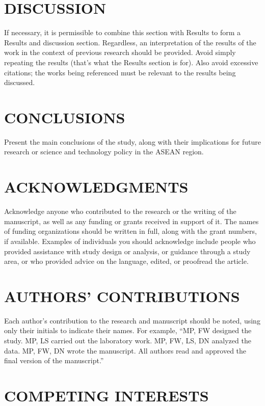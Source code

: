 \documentclass[twocolumn,twoside]{base/ajstd}
\begin{document}
\section{DISCUSSION}

If necessary, it is permissible to combine this section with Results to form a Results and discussion section. Regardless, an interpretation of the results of the work in the context of previous research should be provided. Avoid simply repeating the results (that’s what the Results section is for). Also avoid excessive citations; the works being referenced must be relevant to the results being discussed.

\section{CONCLUSIONS}

Present the main conclusions of the study, along with their implications for future research or science and technology policy in the ASEAN region.

\section*{ACKNOWLEDGMENTS}

Acknowledge anyone who contributed to the research or the writing of the manuscript, as well as any funding or grants received in support of it. The names of funding organizations should be written in full, along with the grant numbers, if available. Examples of individuals you should acknowledge include people who provided assistance with study design or analysis, or guidance through a study area, or who provided advice on the language, edited, or proofread the article.

\section*{AUTHORS’ CONTRIBUTIONS}

Each author’s contribution to the research and manuscript should be noted, using only their initials to indicate their names. For example, “MP, FW designed the study. MP, LS carried out the laboratory work. MP, FW, LS, DN analyzed the data. MP, FW, DN wrote the manuscript. All authors read and approved the final version of the manuscript.”

\section*{COMPETING INTERESTS}
\end{document}
